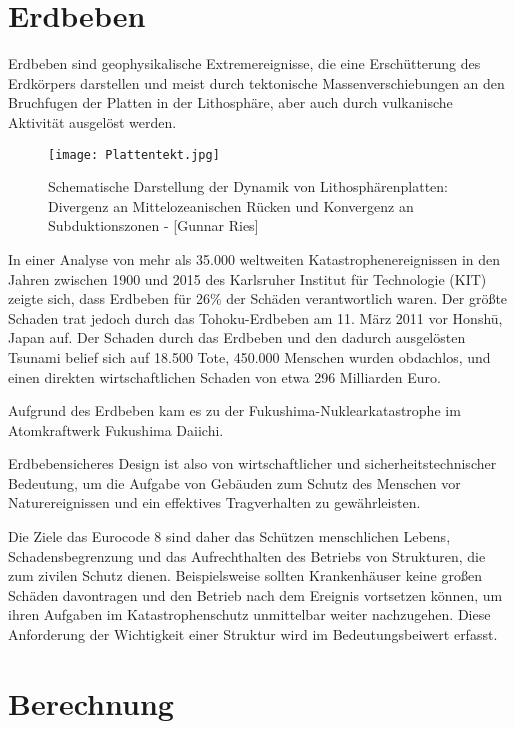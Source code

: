 \section{Erdbeben}
\label{sec:erdbeben}

Erdbeben sind geophysikalische Extremereignisse, die eine Erschütterung des Erdkörpers darstellen und meist durch tektonische Massenverschiebungen an den Bruchfugen der Platten in der Lithosphäre, aber auch durch vulkanische Aktivität ausgelöst werden. \cite{ETHZ}

\begin{figure}[ht]
    \centering
    \texttt{[image: Plattentekt.jpg]}
    \caption{Schematische Darstellung der Dynamik von Lithosphärenplatten: Divergenz an Mittelozeanischen Rücken und Konvergenz an Subduktionszonen - [Gunnar Ries]}
\end{figure}

In einer Analyse von mehr als 35.000 weltweiten Katastrophenereignissen in den Jahren zwischen 1900 und 2015 des Karlsruher Institut für Technologie (KIT) zeigte sich, dass Erdbeben für 26\% der Schäden verantwortlich waren.
Der größte Schaden trat jedoch durch das Tohoku-Erdbeben am 11. März 2011 vor Honshū, Japan auf. Der Schaden durch das Erdbeben und den dadurch ausgelösten Tsunami belief sich auf 18.500 Tote, 450.000 Menschen wurden obdachlos, und einen direkten wirtschaftlichen Schaden von etwa 296 Milliarden Euro. \cite{DANIELL}

Aufgrund des Erdbeben kam es zu der Fukushima-Nuklearkatastrophe im Atomkraftwerk Fukushima Daiichi.

Erdbebensicheres Design ist also von wirtschaftlicher und sicherheitstechnischer Bedeutung, um die Aufgabe von Gebäuden zum Schutz des Menschen vor Naturereignissen und ein effektives Tragverhalten zu gewährleisten.

Die Ziele das Eurocode 8 sind daher das Schützen menschlichen Lebens, Schadensbegrenzung und das Aufrechthalten des Betriebs von Strukturen, die zum zivilen Schutz dienen. Beispielsweise sollten Krankenhäuser keine großen Schäden davontragen und den Betrieb nach dem Ereignis vortsetzen können, um ihren Aufgaben im Katastrophenschutz unmittelbar weiter nachzugehen.
Diese Anforderung der Wichtigkeit einer Struktur wird im Bedeutungsbeiwert erfasst. \cite{EC8}

\pagebreak

\section{Berechnung}
\label{sec:berechnung}

